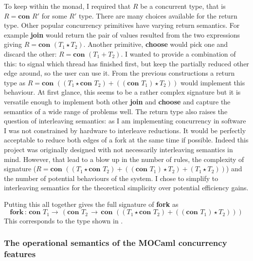 \documentclass[12pt,twoside,notitlepage]{report}
\theoremstyle{plain}%
\theoremstyle{definition}
\theoremstyle{remark}
\begin{document}
To keep within the monad, I required that $ R $ be a concurrent type, that is $ R =  \textbf{con } R' $ for some $ R' $ type. There are many choices available for the return type. Other popular concurrency primitives have varying return semantics. For example \textbf{join} would return the pair of values resulted from the two expressions giving $ R = \textbf{con }(T_1 \star T_2) $. Another primitive, \textbf{choose} would pick one and discard the other: $ R = \textbf{con }(T_1 + T_2) $. I wanted to provide a combination of this: to signal which thread has finished first, but keep the partially reduced other edge around, so the user can use it. From the previous constructions a return type as $ R = \textbf{con }((T_1\star \textbf{con } T_2) + ((\textbf{con } T_1) \star T_2)) $ would implement this behaviour. At first glance, this seems to be a rather complex signature but  it is versatile enough to implement both other \textbf{join} and \textbf{choose} and capture the semantics of a wide range of problems well. The return type also raises the question of interleaving semantics: as I am implementing concurrency in software I was not constrained by hardware to interleave reductions. It would be perfectly acceptable to reduce both edges of a fork at the same time if possible. Indeed this project was originally designed with not necessarily interleaving semantics in mind. However, that lead to a blow up in the number of rules, the complexity of signature ($ R = \textbf{con }((T_1\star \textbf{con } T_2) + ((\textbf{con } T_1) \star T_2) + (T_1 \star T_2))   $) and the number of potential behaviours of the system. I chose to simplify to interleaving semantics for the theoretical simplicity over potential efficiency gains.

Putting this all together gives the full signature of \textbf{fork} as 
\[ \textbf{fork} \, : \, \textbf{con } T_1 \rightarrow \, (\textbf{con } T_2\, \rightarrow\, \textbf{con }((T_1\star \textbf{con } T_2) + ((\textbf{con } T_1) \star T_2)) ) \] 
This corresponds to the type shown in .

\subsubsection{The operational semantics of the MOCaml concurrency features}
\end{document}
